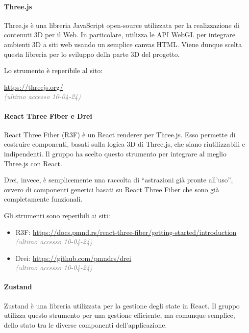 \paragraph{Three.js}
Three.js è una libreria JavaScript open-source utilizzata per la realizzazione di contenuti 3D per il Web. In particolare, utilizza le API WebGL per integrare ambienti 3D a siti web usando un semplice canvas HTML.
Viene dunque scelta questa libreria per lo sviluppo della parte 3D del progetto.
 
\noindent Lo strumento è reperibile al sito:
\begin{center}
    \url{https://threejs.org/}\\ \textcolor{gray}{\textit{(ultimo accesso 10-04-24)}}
\end{center}

\paragraph{React Three Fiber e Drei}
React Three Fiber (R3F) è un React renderer per Three.js. Esso permette di costruire componenti, basati sulla logica 3D di Three.js, che siano riutilizzabili e indipendenti. Il gruppo ha scelto questo strumento per integrare al meglio Three.js con React. 

\noindent Drei, invece, è semplicemente una raccolta di ``astrazioni già pronte all'uso'', ovvero di componenti generici basati su React Three Fiber che sono già completamente funzionali.

 \noindent Gli strumenti sono reperibili ai siti:
\begin{center}
\begin{itemize}
    \item R3F: \url{https://docs.pmnd.rs/react-three-fiber/getting-started/introduction}\\ \textcolor{gray}{\textit{(ultimo accesso 10-04-24)}}
    \item Drei: \url{https://github.com/pmndrs/drei}\\ \textcolor{gray}{\textit{(ultimo accesso 10-04-24)}}
\end{itemize}
\end{center}

\paragraph{Zustand}
Zustand è una libreria utilizzata per la gestione degli state in React. Il gruppo utilizza questo strumento per una gestione efficiente, ma comunque semplice, dello stato tra le diverse componenti dell'applicazione.
 
